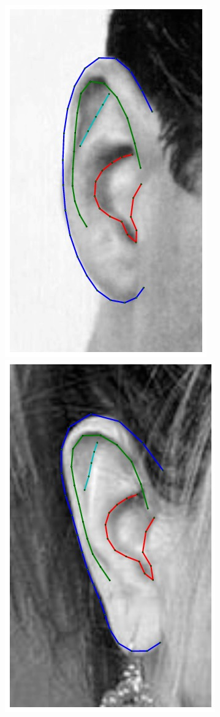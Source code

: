 \begin{figure}[!t]
    \includegraphics[height=\flowh]{resources/Ear_Deformable_Model/fittings/final_0006}
    \includegraphics[height=\flowh]{resources/Ear_Deformable_Model/fittings/final_0007}

\end{figure}
